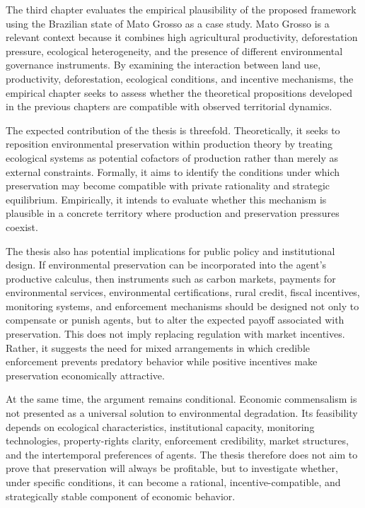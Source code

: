 The third chapter evaluates the empirical plausibility of the proposed framework using the Brazilian state of Mato Grosso as a case study. Mato Grosso is a relevant context because it combines high agricultural productivity, deforestation pressure, ecological heterogeneity, and the presence of different environmental governance instruments. By examining the interaction between land use, productivity, deforestation, ecological conditions, and incentive mechanisms, the empirical chapter seeks to assess whether the theoretical propositions developed in the previous chapters are compatible with observed territorial dynamics.

The expected contribution of the thesis is threefold. Theoretically, it seeks to reposition environmental preservation within production theory by treating ecological systems as potential cofactors of production rather than merely as external constraints. Formally, it aims to identify the conditions under which preservation may become compatible with private rationality and strategic equilibrium. Empirically, it intends to evaluate whether this mechanism is plausible in a concrete territory where production and preservation pressures coexist.

The thesis also has potential implications for public policy and institutional design. If environmental preservation can be incorporated into the agent's productive calculus, then instruments such as carbon markets, payments for environmental services, environmental certifications, rural credit, fiscal incentives, monitoring systems, and enforcement mechanisms should be designed not only to compensate or punish agents, but to alter the expected payoff associated with preservation. This does not imply replacing regulation with market incentives. Rather, it suggests the need for mixed arrangements in which credible enforcement prevents predatory behavior while positive incentives make preservation economically attractive.

At the same time, the argument remains conditional. Economic commensalism is not presented as a universal solution to environmental degradation. Its feasibility depends on ecological characteristics, institutional capacity, monitoring technologies, property-rights clarity, enforcement credibility, market structures, and the intertemporal preferences of agents. The thesis therefore does not aim to prove that preservation will always be profitable, but to investigate whether, under specific conditions, it can become a rational, incentive-compatible, and strategically stable component of economic behavior.

